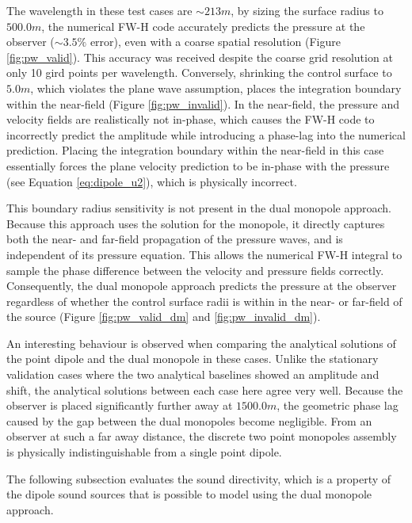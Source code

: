 The wavelength in these test cases are $\sim213m$, by sizing the surface radius to $500.0m$, the numerical FW-H code accurately predicts the pressure at the observer ($\sim3.5\%$ error), even with a coarse spatial resolution (Figure \ref{fig:pw_valid}). This accuracy was received despite the coarse grid resolution at only 10 gird points per wavelength. Conversely, shrinking the control surface to $5.0m$, which violates the plane wave assumption, places the integration boundary within the near-field (Figure \ref{fig:pw_invalid}). In the near-field, the pressure and velocity fields are realistically not in-phase, which causes the FW-H code to incorrectly predict the amplitude while introducing a phase-lag into the numerical prediction. Placing the integration boundary within the near-field in this case essentially forces the plane velocity prediction to be in-phase with the pressure (see Equation \ref{eq:dipole_u2}), which is physically incorrect.

This boundary radius sensitivity is not present in the dual monopole approach. Because this approach uses the solution for the monopole, it directly captures both the near- and far-field propagation of the pressure waves, and is independent of its pressure equation. This allows the numerical FW-H integral to sample the phase difference between the velocity and pressure fields correctly. Consequently, the dual monopole approach predicts the pressure at the observer regardless of whether the control surface radii is within in the near- or far-field of the source (Figure \ref{fig:pw_valid_dm} and \ref{fig:pw_invalid_dm}).

An interesting behaviour is observed when comparing the analytical solutions of the point dipole and the dual monopole in these cases. Unlike the stationary validation cases where the two analytical baselines showed an amplitude and shift, the analytical solutions between each case here agree very well. Because the observer is placed significantly further away at $1500.0m$, the geometric phase lag caused by the gap between the dual monopoles become negligible. From an observer at such a far away distance, the discrete two point monopoles assembly is physically indistinguishable from a single point dipole.

The following subsection evaluates the sound directivity, which is a property of the dipole sound sources that is possible to model using the dual monopole approach.

\clearpage
